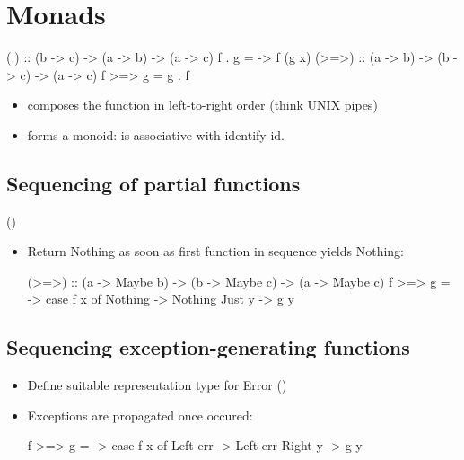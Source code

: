 

\chapter{Monads} %
\label{cha:monads}


\begin{codebox}[haskell]
(.) :: (b -> c) -> (a -> b) -> (a -> c)
f . g = \x -> f (g x)
(>=>) :: (a -> b) -> (b -> c) -> (a -> c)
f >=> g = g . f
\end{codebox}
\begin{itemize}
    \item {} composes the function in left-to-right order (think UNIX pipes)
    \item {} forms a monoid: \codeline{>=>} is associative with identify id.
\end{itemize}


\section{Sequencing of partial functions} 
()

\begin{itemize}
    \item Return Nothing as soon as first function in sequence yields Nothing:\\
        \begin{codebox}[haskell]
(>=>) :: (a -> Maybe b) -> (b -> Maybe c) -> (a -> Maybe c)
f >=> g = \x -> case f x of
        Nothing -> Nothing
        Just y  -> g y
        \end{codebox}
\end{itemize}



\section{Sequencing exception-generating functions }

 
\begin{itemize}
    \item Define suitable representation type for Error ()
    \item Exceptions are propagated once occured:
\begin{codebox}[haskell]
f >=> g = \x -> case f x of
    Left err -> Left err
    Right y  -> g y
\end{codebox}
\end{itemize}

